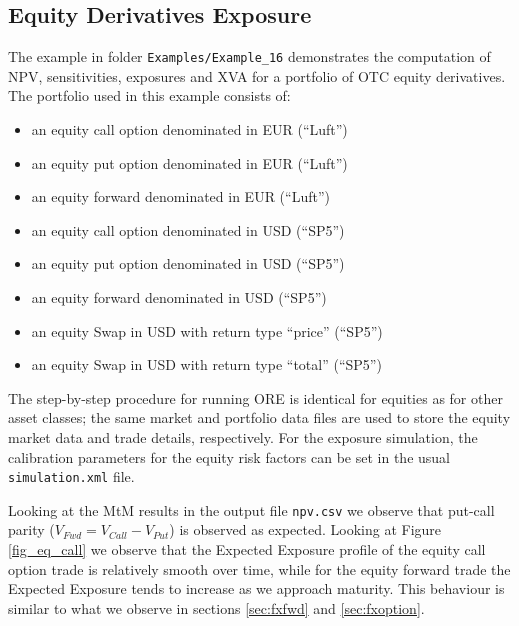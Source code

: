 \documentclass[12pt, a4paper]{article}
\begin{document}
{\subsection{Equity Derivatives Exposure}\label{ex:equityderivatives}

The example in folder {\tt Examples/Example\_16} demonstrates the computation of NPV, sensitivities, exposures and XVA for a portfolio 
of OTC equity derivatives. The portfolio used in this example consists of:

\begin{itemize}
	\item an equity call option denominated in EUR (``Luft'')
	\item an equity put option denominated in EUR (``Luft'')
	\item an equity forward denominated in EUR (``Luft'')
	\item an equity call option denominated in USD (``SP5'')
	\item an equity put option denominated in USD (``SP5'')
	\item an equity forward denominated in USD (``SP5'')
	\item an equity Swap in USD with return type  ``price'' (``SP5'')
	\item an equity Swap in USD with return type ``total'' (``SP5'')
\end{itemize}

The step-by-step procedure for running ORE is identical for equities as for other asset classes; the same market and 
portfolio data files are used to store the equity market data and trade details, respectively. For the exposure 
simulation, the calibration parameters for the equity risk factors can be set in the usual {\tt simulation.xml} file.

Looking at the MtM results in the output file {\tt npv.csv} we observe that put-call parity ($V_{Fwd} = V_{Call} - 
V_{Put}$) is observed as expected. Looking at Figure \ref{fig_eq_call} we observe that the Expected Exposure profile of 
the equity call option trade is relatively smooth over time, while for the equity forward trade the Expected Exposure 
tends to increase as we approach maturity. This behaviour is similar to what we observe in sections \ref{sec:fxfwd} 
and \ref{sec:fxoption}. 

}
\end{document}
